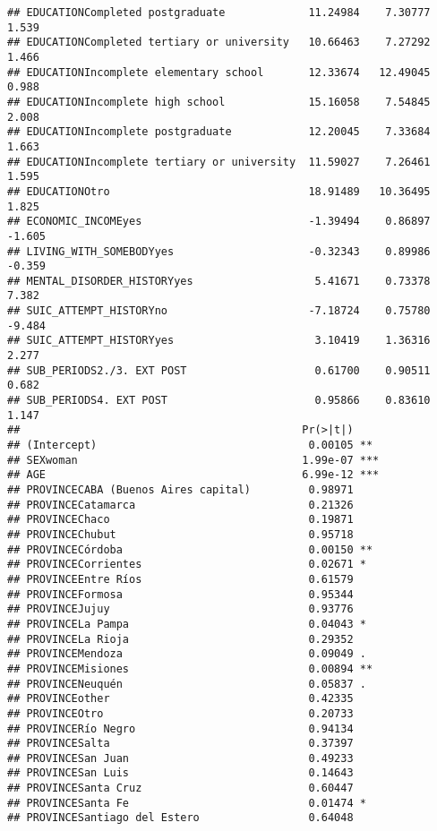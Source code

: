 \documentclass[
]{book}
\begin{document}
\begin{verbatim}
## EDUCATIONCompleted postgraduate             11.24984    7.30777   1.539
## EDUCATIONCompleted tertiary or university   10.66463    7.27292   1.466
## EDUCATIONIncomplete elementary school       12.33674   12.49045   0.988
## EDUCATIONIncomplete high school             15.16058    7.54845   2.008
## EDUCATIONIncomplete postgraduate            12.20045    7.33684   1.663
## EDUCATIONIncomplete tertiary or university  11.59027    7.26461   1.595
## EDUCATIONOtro                               18.91489   10.36495   1.825
## ECONOMIC_INCOMEyes                          -1.39494    0.86897  -1.605
## LIVING_WITH_SOMEBODYyes                     -0.32343    0.89986  -0.359
## MENTAL_DISORDER_HISTORYyes                   5.41671    0.73378   7.382
## SUIC_ATTEMPT_HISTORYno                      -7.18724    0.75780  -9.484
## SUIC_ATTEMPT_HISTORYyes                      3.10419    1.36316   2.277
## SUB_PERIODS2./3. EXT POST                    0.61700    0.90511   0.682
## SUB_PERIODS4. EXT POST                       0.95866    0.83610   1.147
##                                            Pr(>|t|)    
## (Intercept)                                 0.00105 ** 
## SEXwoman                                   1.99e-07 ***
## AGE                                        6.99e-12 ***
## PROVINCECABA (Buenos Aires capital)         0.98971    
## PROVINCECatamarca                           0.21326    
## PROVINCEChaco                               0.19871    
## PROVINCEChubut                              0.95718    
## PROVINCECórdoba                             0.00150 ** 
## PROVINCECorrientes                          0.02671 *  
## PROVINCEEntre Ríos                          0.61579    
## PROVINCEFormosa                             0.95344    
## PROVINCEJujuy                               0.93776    
## PROVINCELa Pampa                            0.04043 *  
## PROVINCELa Rioja                            0.29352    
## PROVINCEMendoza                             0.09049 .  
## PROVINCEMisiones                            0.00894 ** 
## PROVINCENeuquén                             0.05837 .  
## PROVINCEother                               0.42335    
## PROVINCEOtro                                0.20733    
## PROVINCERío Negro                           0.94134    
## PROVINCESalta                               0.37397    
## PROVINCESan Juan                            0.49233    
## PROVINCESan Luis                            0.14643    
## PROVINCESanta Cruz                          0.60447    
## PROVINCESanta Fe                            0.01474 *  
## PROVINCESantiago del Estero                 0.64048    

\end{verbatim}
\end{document}
